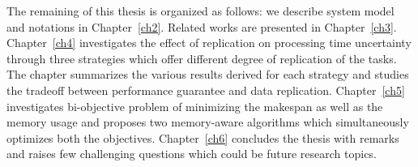  The remaining of this thesis is organized as follows: we describe system
 model and notations in Chapter~\ref{ch2}. Related works are presented
 in Chapter~\ref{ch3}. Chapter~\ref{ch4} investigates the effect of replication  on processing time uncertainty through three strategies which offer different degree of replication of the tasks. The chapter summarizes the various results derived for each strategy and studies the tradeoff between performance guarantee and data replication. Chapter~\ref{ch5} investigates bi-objective problem of minimizing the makespan as well as the memory usage and proposes two memory-aware algorithms which simultaneously optimizes both the objectives. Chapter~\ref{ch6} concludes the thesis with remarks and raises few challenging questions which could be future research topics. 
 

 